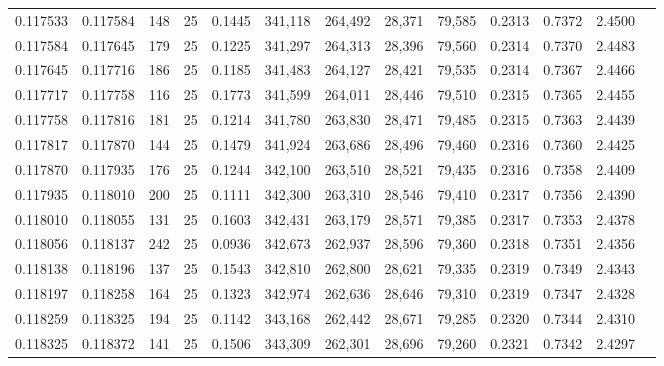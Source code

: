 \begin{tabular}{rrrrrrrrrrrrr}
0.117533 & 0.117584 &   148 &  25 &                                     0.1445 & 341,118 & 264,492 &  28,371 &  79,585 & 0.2313 & 0.7372 & 2.4500 \\
0.117584 & 0.117645 &   179 &  25 &                                     0.1225 & 341,297 & 264,313 &  28,396 &  79,560 & 0.2314 & 0.7370 & 2.4483 \\
0.117645 & 0.117716 &   186 &  25 &                                     0.1185 & 341,483 & 264,127 &  28,421 &  79,535 & 0.2314 & 0.7367 & 2.4466 \\
0.117717 & 0.117758 &   116 &  25 &                                     0.1773 & 341,599 & 264,011 &  28,446 &  79,510 & 0.2315 & 0.7365 & 2.4455 \\
0.117758 & 0.117816 &   181 &  25 &                                     0.1214 & 341,780 & 263,830 &  28,471 &  79,485 & 0.2315 & 0.7363 & 2.4439 \\
0.117817 & 0.117870 &   144 &  25 &                                     0.1479 & 341,924 & 263,686 &  28,496 &  79,460 & 0.2316 & 0.7360 & 2.4425 \\
0.117870 & 0.117935 &   176 &  25 &                                     0.1244 & 342,100 & 263,510 &  28,521 &  79,435 & 0.2316 & 0.7358 & 2.4409 \\
0.117935 & 0.118010 &   200 &  25 &                                     0.1111 & 342,300 & 263,310 &  28,546 &  79,410 & 0.2317 & 0.7356 & 2.4390 \\
0.118010 & 0.118055 &   131 &  25 &                                     0.1603 & 342,431 & 263,179 &  28,571 &  79,385 & 0.2317 & 0.7353 & 2.4378 \\
0.118056 & 0.118137 &   242 &  25 &                                     0.0936 & 342,673 & 262,937 &  28,596 &  79,360 & 0.2318 & 0.7351 & 2.4356 \\
0.118138 & 0.118196 &   137 &  25 &                                     0.1543 & 342,810 & 262,800 &  28,621 &  79,335 & 0.2319 & 0.7349 & 2.4343 \\
0.118197 & 0.118258 &   164 &  25 &                                     0.1323 & 342,974 & 262,636 &  28,646 &  79,310 & 0.2319 & 0.7347 & 2.4328 \\
0.118259 & 0.118325 &   194 &  25 &                                     0.1142 & 343,168 & 262,442 &  28,671 &  79,285 & 0.2320 & 0.7344 & 2.4310 \\
0.118325 & 0.118372 &   141 &  25 &                                     0.1506 & 343,309 & 262,301 &  28,696 &  79,260 & 0.2321 & 0.7342 & 2.4297 \\

\end{tabular}
